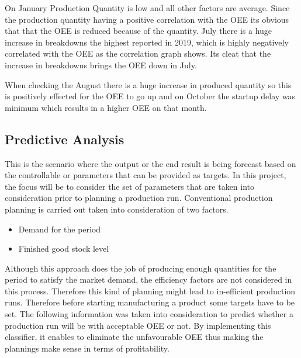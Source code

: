 On January Production Quantity is low and all other factors are average. Since the production quantity having a positive correlation with the OEE its obvious that that the OEE is reduced because of the quantity. July there is a huge increase in breakdowns the highest reported in 2019, which is highly negatively correlated with the OEE as the correlation graph shows. Its cleat that the increase in breakdowns brings the OEE down in July. 

When checking the August there is a huge increase in produced quantity so this is positively effected for the OEE to go up and on October the startup delay was minimum which results in a higher OEE on that month. \\

\subsection{Predictive Analysis}

This is the scenario where the output or the end result is being forecast based on the controllable or parameters that can be provided as targets. In this project, the focus will be to consider the set of parameters that are taken into consideration prior to planning a production run. Conventional production planning is carried out taken into consideration of two factors.

\begin{itemize}
  \item Demand for the period 
  \item Finished good stock level
\end{itemize}

Although this approach does the job of producing enough quantities for the period to satisfy the market demand, the efficiency factors are not considered in this process. Therefore this kind of planning might lead to in-efficient production runs. Therefore before starting manufacturing a product some targets have to be set. The following information was taken into consideration to predict whether a production run will be with acceptable OEE or not. By implementing this classifier, it enables to eliminate the unfavourable OEE thus making the plannings make sense in terms of profitability. \\

